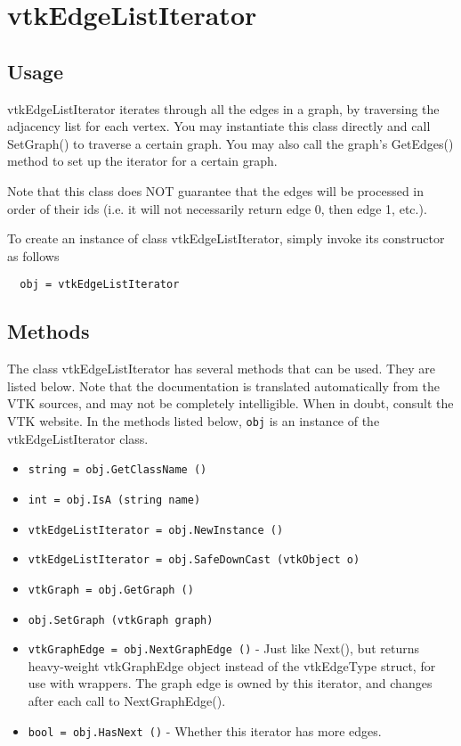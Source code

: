 \section{vtkEdgeListIterator}

\subsection{Usage}

 vtkEdgeListIterator iterates through all the edges in a graph, by traversing
 the adjacency list for each vertex. You may instantiate this class directly
 and call SetGraph() to traverse a certain graph. You may also call the graph's
 GetEdges() method to set up the iterator for a certain graph.

 Note that this class does NOT guarantee that the edges will be processed in
 order of their ids (i.e. it will not necessarily return edge 0, then edge 1,
 etc.).


To create an instance of class vtkEdgeListIterator, simply
invoke its constructor as follows
\begin{verbatim}
  obj = vtkEdgeListIterator
\end{verbatim}
\subsection{Methods}

The class vtkEdgeListIterator has several methods that can be used.
  They are listed below.
Note that the documentation is translated automatically from the VTK sources,
and may not be completely intelligible.  When in doubt, consult the VTK website.
In the methods listed below, \verb|obj| is an instance of the vtkEdgeListIterator class.
\begin{itemize}
\item  \verb|string = obj.GetClassName ()|

\item  \verb|int = obj.IsA (string name)|

\item  \verb|vtkEdgeListIterator = obj.NewInstance ()|

\item  \verb|vtkEdgeListIterator = obj.SafeDownCast (vtkObject o)|

\item  \verb|vtkGraph = obj.GetGraph ()|

\item  \verb|obj.SetGraph (vtkGraph graph)|

\item  \verb|vtkGraphEdge = obj.NextGraphEdge ()| -  Just like Next(), but
 returns heavy-weight vtkGraphEdge object instead of
 the vtkEdgeType struct, for use with wrappers.
 The graph edge is owned by this iterator, and changes
 after each call to NextGraphEdge().

\item  \verb|bool = obj.HasNext ()| -  Whether this iterator has more edges.

\end{itemize}
